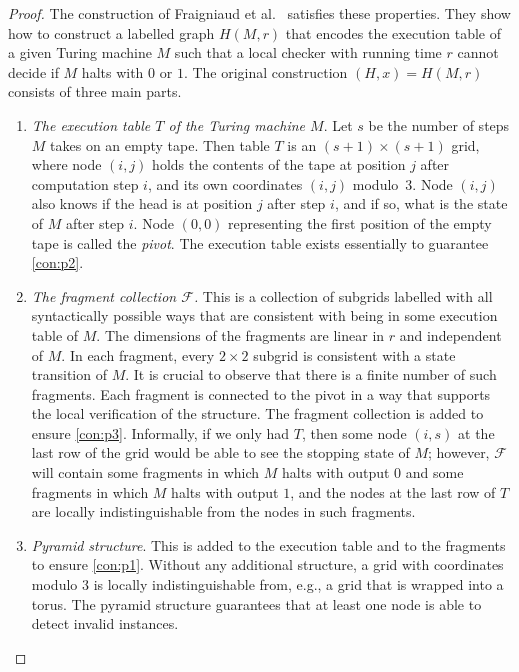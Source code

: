 \documentclass[11pt,a4paper]{article}
\theoremstyle{definition}
\theoremstyle{remark}
\newcommand{\F}{\mathcal{F}}
\begin{document}
\begin{proof}
The construction of Fraigniaud et al.~\cite{fraigniaud13ld-id} satisfies these properties. They show how to construct a labelled graph $H(M,r)$ that encodes the execution table of a given Turing machine $M$ such that a local checker with running time $r$ cannot decide if $M$ halts with $0$ or $1$. The original construction $(H, x) = H(M,r)$ consists of three main parts. 
\begin{enumerate}[label=(\roman*),leftmargin=9mm]
    \item \emph{The execution table $T$ of the Turing machine $M$}. Let $s$ be the number of steps $M$ takes on an empty tape. Then table $T$ is an $(s+1) \times (s+1)$ grid, where node $(i,j)$ holds the contents of the tape at position $j$ after computation step $i$, and its own coordinates $(i,j)$ modulo~$3$. Node $(i,j)$ also knows if the head is at position $j$ after step $i$, and if so, what is the state of $M$ after step $i$. Node $(0,0)$ representing the first position of the empty tape is called the \emph{pivot}. The execution table exists essentially to guarantee \ref{con:p2}. \label{part-1}
    \item \label{part-2} \emph{The fragment collection $\F$.} This is a collection of subgrids labelled with all syntactically possible ways that are consistent with being in some execution table of $M$. The dimensions of the fragments are linear in $r$ and independent of $M$. In each fragment, every $2\times2$ subgrid is consistent with a state transition of $M$. It is crucial to observe that there is a finite number of such fragments. Each fragment is connected to the pivot in a way that supports the local verification of the structure. The fragment collection is added to ensure \ref{con:p3}. Informally, if we only had $T$, then some node $(i,s)$ at the last row of the grid would be able to see the stopping state of $M$; however, $\F$ will contain some fragments in which $M$ halts with output $0$ and some fragments in which $M$ halts with output $1$, and the nodes at the last row of $T$ are locally indistinguishable from the nodes in such fragments.
    \item \emph{Pyramid structure}. This is added to the execution table and to the fragments to ensure \ref{con:p1}. Without any additional structure, a grid with coordinates modulo $3$ is locally indistinguishable from, e.g., a grid that is wrapped into a torus. The pyramid structure guarantees that at least one node is able to detect invalid instances.
\end{enumerate}


\end{proof}
\end{document}
